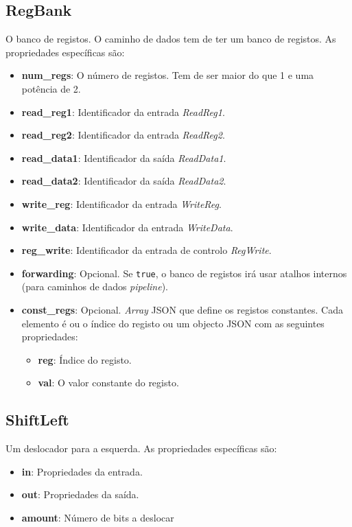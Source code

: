 \documentclass[11pt,a4paper,twoside,titlepage]{report}
\begin{document}
\subsection{RegBank}

O banco de registos. O caminho de dados tem de ter um banco de registos.
As propriedades específicas são:
\begin{itemize}
	\item \textbf{num\_regs}: O número de registos. Tem de ser maior do que 1 e
		uma potência de 2.
	\item \textbf{read\_reg1}: Identificador da entrada \emph{ReadReg1}.
	\item \textbf{read\_reg2}: Identificador da entrada \emph{ReadReg2}.
	\item \textbf{read\_data1}: Identificador da saída \emph{ReadData1}.
	\item \textbf{read\_data2}: Identificador da saída \emph{ReadData2}.
	\item \textbf{write\_reg}: Identificador da entrada \emph{WriteReg}.
	\item \textbf{write\_data}: Identificador da entrada \emph{WriteData}.
	\item \textbf{reg\_write}: Identificador da entrada de controlo \emph{RegWrite}.
	\item \textbf{forwarding}: Opcional. Se \verb+true+, o banco de registos irá
		usar atalhos internos (para caminhos de dados \emph{pipeline}).
	\item \textbf{const\_regs}: Opcional. \emph{Array} JSON que define os registos
		constantes. Cada elemento é ou o índice do registo ou um objecto JSON com
		as seguintes propriedades:
		\begin{itemize}
			\item \textbf{reg}: Índice do registo.
			\item \textbf{val}: O valor constante do registo.
		\end{itemize}
\end{itemize}

\subsection{ShiftLeft}

Um deslocador para a esquerda. As propriedades específicas são:
\begin{itemize}
	\item \textbf{in}: Propriedades da entrada.
	\item \textbf{out}: Propriedades da saída.
	\item \textbf{amount}: Número de bits a deslocar
\end{itemize}
\end{document}
